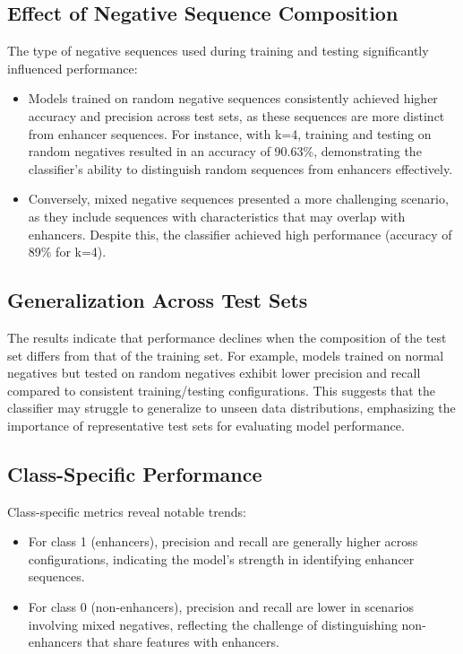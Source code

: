 \documentclass[11pt, a4paper, hidelinks]{article}
\begin{document}
\subsection{Effect of Negative Sequence Composition}\label{subsec:effect-of-negative-sequence-composition}
The type of negative sequences used during training and testing significantly influenced performance:

\begin{itemize}
    \item Models trained on random negative sequences consistently achieved higher accuracy and precision across test sets, as these sequences are more distinct from enhancer sequences. For instance, with k=4, training and testing on random negatives resulted in an accuracy of 90.63\%, demonstrating the classifier's ability to distinguish random sequences from enhancers effectively.
    \item Conversely, mixed negative sequences presented a more challenging scenario, as they include sequences with characteristics that may overlap with enhancers. Despite this, the classifier achieved high performance (accuracy of 89\% for k=4).
\end{itemize}

\subsection{Generalization Across Test Sets}\label{subsec:generalization-across-test-sets}
The results indicate that performance declines when the composition of the test set differs from that of the training set. For example, models trained on normal negatives but tested on random negatives exhibit lower precision and recall compared to consistent training/testing configurations. This suggests that the classifier may struggle to generalize to unseen data distributions, emphasizing the importance of representative test sets for evaluating model performance.

\subsection{Class-Specific Performance}\label{subsec:class-specific-performance}
Class-specific metrics reveal notable trends:
\begin{itemize}
    \item For class 1 (enhancers), precision and recall are generally higher across configurations, indicating the model's strength in identifying enhancer sequences.
    \item For class 0 (non-enhancers), precision and recall are lower in scenarios involving mixed negatives, reflecting the challenge of distinguishing non-enhancers that share features with enhancers.
\end{itemize}
\end{document}
